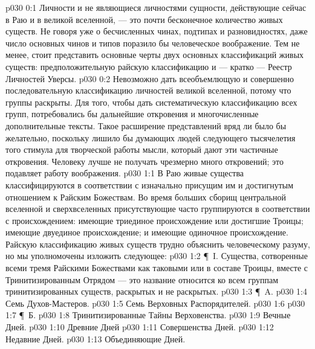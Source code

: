 \vs p030 0:1 Личности и не являющиеся личностями сущности, действующие сейчас в Раю и в великой вселенной, --- это почти бесконечное количество живых существ. Не говоря уже о бесчисленных чинах, подтипах и разновидностях, даже число основных чинов и типов поразило бы человеческое воображение. Тем не менее, стоит представить основные черты двух основных классификаций живых существ: предположительную райскую классификацию и --- кратко --- Реестр Личностей Уверсы.
\vs p030 0:2 Невозможно дать всеобъемлющую и совершенно последовательную классификацию личностей великой вселенной, потому что  группы раскрыты. Для того, чтобы дать систематическую классификацию всех групп, потребовались бы дальнейшие откровения и многочисленные дополнительные тексты. Такое расширение представлений вряд ли было бы желательно, поскольку лишило бы думающих людей следующего тысячелетия того стимула для творческой работы мысли, который дают эти частичные откровения. Человеку лучше не получать чрезмерно много откровений; это подавляет работу воображения.
\vs p030 1:1 В Раю живые существа классифицируются в соответствии с изначально присущим им и достигнутым отношением к Райским Божествам. Во время больших сборищ центральной вселенной и сверхвселенных присутствующие часто группируются в соответствии с происхождением: имеющие триединое происхождение или достигшие Троицы; имеющие двуединое происхождение; и имеющие одиночное происхождение. Райскую классификацию живых существ трудно объяснить человеческому разуму, но мы уполномочены изложить следующее:
\vs p030 1:2 \P\ I.  Существа, сотворенные всеми тремя Райскими Божествами как таковыми или в составе Троицы, вместе с Тринитизированным Отрядом --- это название относится ко всем группам тринитизированных существ, раскрытых и не раскрытых.
\vs p030 1:3 \P\ A. 
\vs p030 1:4 \bibnobreakspace Семь Духов\hyp{}Мастеров.
\vs p030 1:5 \bibnobreakspace Семь Верховных Распорядителей.
\vs p030 1:6 \bibnobreakspace {}
\vs p030 1:7 \P\ Б. 
\vs p030 1:8 \bibnobreakspace Тринитизированные Тайны Верховенства.
\vs p030 1:9 \bibnobreakspace Вечные Дней.
\vs p030 1:10 \bibnobreakspace Древние Дней
\vs p030 1:11 \bibnobreakspace Совершенства Дней.
\vs p030 1:12 \bibnobreakspace Недавние Дней.
\vs p030 1:13 \bibnobreakspace Объединяющие Дней.

